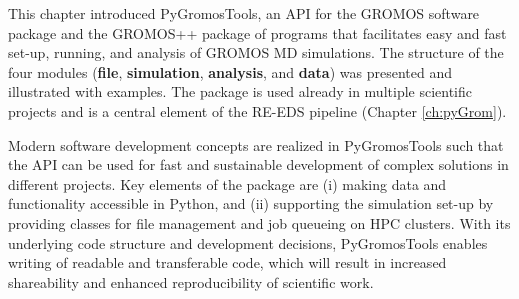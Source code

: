This chapter introduced PyGromosTools, an API for the GROMOS software package and the GROMOS++ package of programs that facilitates easy and fast set-up, running, and analysis of GROMOS MD simulations. The structure of the four modules (\textbf{file}, \textbf{simulation}, \textbf{analysis}, and \textbf{data}) was presented and illustrated with examples.  
The package is used already in multiple scientific projects and is a central element of the RE-EDS pipeline (Chapter \ref{ch:pyGrom}). 

Modern software development concepts are realized in PyGromosTools such that the API can be used for fast and sustainable development of complex solutions in different projects. Key elements of the package are (i) making data and functionality accessible in Python, and (ii) supporting the simulation set-up by providing classes for file management and job queueing on HPC clusters. With its underlying code structure and development decisions, PyGromosTools enables writing of readable and transferable code, which will result in increased shareability and enhanced reproducibility of scientific work.  \cite{Walters2020}

\FloatBarrier